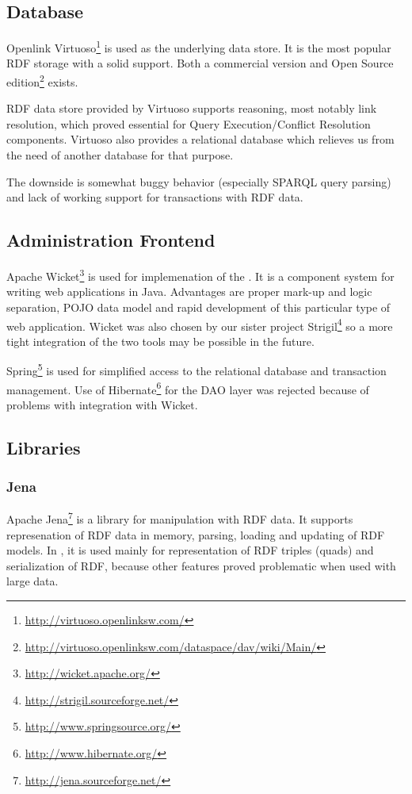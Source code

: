\subsection{Database}
Openlink Virtuoso\footnote{\url{http://virtuoso.openlinksw.com/}} is used as the underlying data store. It is the most popular RDF storage with a solid support. Both a commercial version and Open Source edition\footnote{\url{http://virtuoso.openlinksw.com/dataspace/dav/wiki/Main/}} exists.

RDF data store provided by Virtuoso supports reasoning, most notably  link resolution, which proved essential for Query Execution/Conflict Resolution components. Virtuoso also provides a relational database which relieves us from the need of another database for that purpose.

The downside is somewhat buggy behavior (especially SPARQL query parsing) and lack of working support for transactions with RDF data.

\subsection{Administration Frontend}
Apache Wicket\footnote{\url{http://wicket.apache.org/}} is used for implemenation of the \FE. It is a component system for writing web applications in Java. Advantages are proper mark-up and logic separation, POJO data model and rapid development of this particular type of web application. Wicket was also chosen by our sister project Strigil\footnote{\url{http://strigil.sourceforge.net/}} so a more tight integration of the two tools may be possible in the future.

Spring\footnote{\url{http://www.springsource.org/}} is used for simplified access to the relational database and transaction management. Use of Hibernate\footnote{\url{http://www.hibernate.org/}} for the DAO layer was rejected because of problems with integration with Wicket.

\subsection{Libraries}
\subsubsection*{Jena}
Apache Jena\footnote{\url{http://jena.sourceforge.net/}} is a library for manipulation with RDF data. It supports represenation of RDF data in memory, parsing, loading and updating of RDF models. In \odcs, it is used mainly for representation of RDF triples (quads) and serialization of RDF, because other features proved problematic when used with large data.

